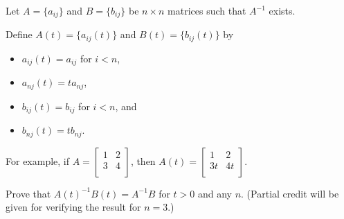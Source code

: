 Let $A=\lbrace a_{ij} \rbrace$ and $B=\lbrace b_{ij} \rbrace$ be $n \times n$
matrices such that $A^{-1}$ exists.

Define $A(t)=\lbrace a_{ij}(t) \rbrace$ and $B(t)=\lbrace b_{ij}(t) \rbrace$ by

\begin{itemize}

\item $a_{ij}(t)=a_{ij}$ for $i<n$,
\item $a_{nj}(t)=ta_{nj}$,
\item $b_{ij}(t)=b_{ij}$ for $i<n$, and
\item $b_{nj}(t)=tb_{nj}$.

\end{itemize}

For example, if
$A = \begin{bmatrix}
       1 & 2 \\
       3 & 4 \\
     \end{bmatrix}$, then
$A(t) = \begin{bmatrix}
          1  &  2 \\
          3t & 4t \\
        \end{bmatrix}$.

Prove that $A(t)^{-1}B(t)=A^{-1}B$ for $t>0$ and any $n$. (Partial credit will
be given for verifying the result for $n=3$.)
